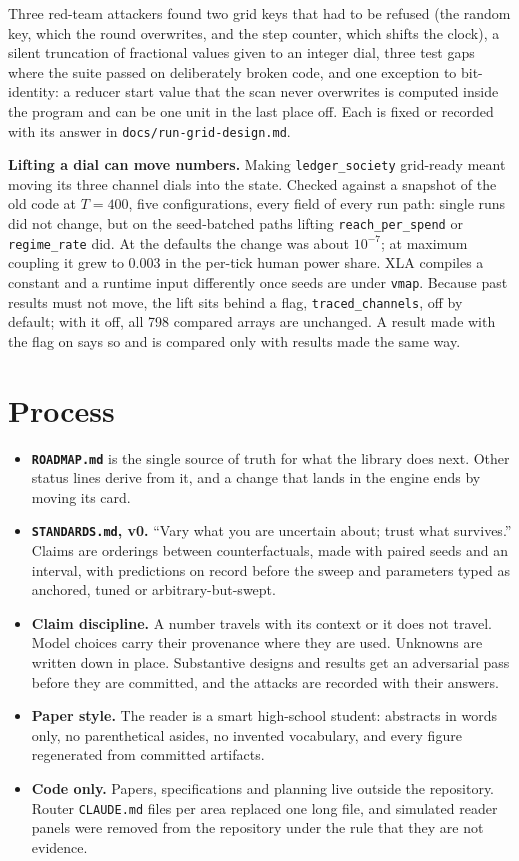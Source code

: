 \documentclass[11pt]{article}
\newcommand{\code}[1]{\texttt{#1}}
\begin{document}
\noindent Three red-team attackers found two grid keys that had to be refused (the
random key, which the round overwrites, and the step counter, which shifts the clock),
a silent truncation of fractional values given to an integer dial, three test gaps
where the suite passed on deliberately broken code, and one exception to bit-identity:
a reducer start value that the scan never overwrites is computed inside the program and
can be one unit in the last place off. Each is fixed or recorded with its answer in
\code{docs/run-grid-design.md}.

\textbf{Lifting a dial can move numbers.} Making \code{ledger\_society} grid-ready meant
moving its three channel dials into the state. Checked against a snapshot of the old
code at $T=400$, five configurations, every field of every run path: single runs did
not change, but on the seed-batched paths lifting \code{reach\_per\_spend} or
\code{regime\_rate} did. At the defaults the change was about $10^{-7}$; at maximum
coupling it grew to 0.003 in the per-tick human power share. XLA compiles a constant
and a runtime input differently once seeds are under \code{vmap}. Because past results
must not move, the lift sits behind a flag, \code{traced\_channels}, off by default;
with it off, all 798 compared arrays are unchanged. A result made with the flag on says
so and is compared only with results made the same way.

\section{Process}

\begin{itemize}
\item \textbf{\code{ROADMAP.md}} is the single source of truth for what the library does
  next. Other status lines derive from it, and a change that lands in the engine ends by
  moving its card.
\item \textbf{\code{STANDARDS.md}, v0.} ``Vary what you are uncertain about; trust what
  survives.'' Claims are orderings between counterfactuals, made with paired seeds and
  an interval, with predictions on record before the sweep and parameters typed as
  anchored, tuned or arbitrary-but-swept.
\item \textbf{Claim discipline.} A number travels with its context or it does not
  travel. Model choices carry their provenance where they are used. Unknowns are written
  down in place. Substantive designs and results get an adversarial pass before they
  are committed, and the attacks are recorded with their answers.
\item \textbf{Paper style.} The reader is a smart high-school student: abstracts in
  words only, no parenthetical asides, no invented vocabulary, and every figure
  regenerated from committed artifacts.
\item \textbf{Code only.} Papers, specifications and planning live outside the
  repository. Router \code{CLAUDE.md} files per area replaced one long file, and
  simulated reader panels were removed from the repository under the rule that they are
  not evidence.
\end{itemize}
\end{document}
